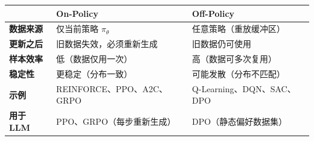 \begin{center}
\begin{tabular}{@{}l l l@{}}
\toprule
 & \textbf{On-Policy} & \textbf{Off-Policy} \\
\midrule
\textbf{数据来源} & 仅当前策略 $\pi_\theta$ & 任意策略（重放缓冲区） \\
\textbf{更新之后} & 旧数据失效，必须重新生成 & 旧数据仍可使用 \\
\textbf{样本效率} & 低（数据仅用一次） & 高（数据可多次复用） \\
\textbf{稳定性} & 更稳定（分布一致） & 可能发散（分布不匹配） \\
\textbf{示例} & REINFORCE、PPO、A2C、GRPO & Q-Learning、DQN、SAC、DPO \\
\textbf{用于 LLM} & PPO、GRPO（每步重新生成） & DPO（静态偏好数据集） \\
\bottomrule
\end{tabular}
\end{center}

